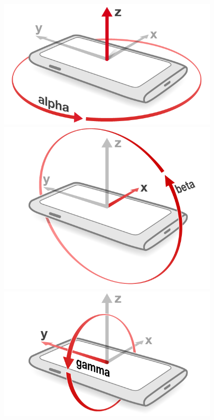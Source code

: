 \begin{figure}[H]
  \hspace{-2cm}
  \centering
  \begin{minipage}[c]{.23\textwidth}
    \centering
    \includegraphics[scale=0.2]{img/device-alpha}
  \end{minipage}
  \hspace{1.5cm}
  \begin{minipage}[c]{.23\textwidth}
    \centering
    \includegraphics[scale=0.2]{img/device-beta}
  \end{minipage}
  \hspace{1.5cm}
  \begin{minipage}[c]{.23\textwidth}
    \centering
    \includegraphics[scale=0.2]{img/device-gamma}

\end{minipage}
\end{figure}
